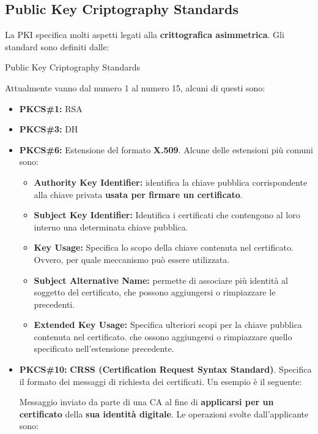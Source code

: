 \subsection{Public Key Criptography Standards}
La PKI specifica molti aspetti legati alla \textbf{crittografica asimmetrica}. Gli standard sono definiti dalle:
\begin{definition}[PKCS]
Public Key Criptography Standards
\end{definition}
Attualmente vanno dal numero 1 al numero 15, alcuni di questi sono: 
\begin{itemize}
    \item \textbf{PKCS\#1:} RSA
    \item \textbf{PKCS\#3:} DH
    \item \textbf{PKCS\#6:} Estensione del formato \textbf{X.509}. Alcune delle estensioni più comuni sono:
    \begin{proposition}[X.509 Extensions]
    \begin{itemize}
        \item \textbf{Authority Key Identifier:} identifica la chiave pubblica corrispondente alla chiave privata \textbf{usata per firmare un certificato}.
        \item \textbf{Subject Key Identifier:} Identifica i certificati che contengono al loro interno una determinata chiave pubblica.
        \item \textbf{Key Usage:} Specifica lo scopo della chiave contenuta nel certificato. Ovvero, per quale meccanismo può essere utilizzata.
        \item \textbf{Subject Alternative Name:} permette di associare più identità al soggetto del certificato, che possono aggiungersi o rimpiazzare le precedenti.
        \item \textbf{Extended Key Usage:} Specifica ulteriori scopi per la chiave pubblica contenuta nel certificato. che ossono aggiungersi o rimpiazzare quello specificato nell'estensione precedente.
    \end{itemize}
    \end{proposition}
    \item \textbf{PKCS\#10:} \textbf{CRSS (Certification Request Syntax Standard)}. Specifica il formato dei messaggi di richiesta dei certificati. Un esempio è il seguente:
    \begin{proposition}
    Messaggio inviato da parte di una CA al fine di \textbf{applicarsi per un certificato} della \textbf{sua identità digitale}. Le operazioni svolte dall'applicante sono:

\end{proposition}
\end{itemize}
